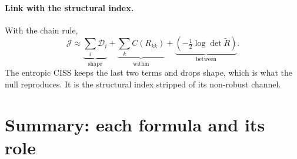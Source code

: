 \documentclass[11pt]{article}
\theoremstyle{plain}
\theoremstyle{definition}
\theoremstyle{remark}
\newcommand{\JJ}{\mathcal{J}}
\newcommand{\DD}{\mathcal{D}}
\begin{document}
\paragraph{Link with the structural index.} With the chain rule,
\[
\JJ\approx\underbrace{\textstyle\sum_i\DD_i}_{\text{shape}}
+\underbrace{\textstyle\sum_kC(R_{kk})}_{\text{within}}
+\underbrace{(-\tfrac12\log\det\tilde R)}_{\text{between}} .
\]
The entropic CISS keeps the last two terms and drops shape, which is what the
null reproduces. It is the structural index stripped of its non-robust
channel.

\section{Summary: each formula and its role}
\label{sec:recap}
\end{document}
